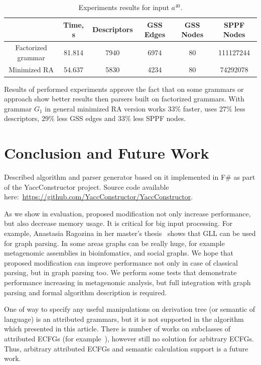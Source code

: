 \documentclass[runningheads,a4paper]{llncs}
\begin{document}
\begin{table}[h]   
\begin{center}
    \begin{tabular}{  c | c | c | c | c | c }
        
                           & Time, s & Descriptors & GSS Edges & GSS Nodes & SPPF Nodes   \\ \hline
        Factorized grammar & 81.814  & 7940        & 6974      & 80        & 111127244  \\ \hline
        Minimized RA       & 54.637  & 5830        & 4234      & 80        & 74292078  \\ 
    \end{tabular}
\end{center}
\caption{Experiments results for input $a^{40}$.}
\label{expTable}
\end{table}



Results of performed experiments approve the fact that on some grammars or approach 
show better results then parsers built on factorized grammars.
With grammar $G_1$ in general minimized RA version works $33\%$ faster, uses $27\%$ less descriptors, $29\%$ less GSS edges
and $33\%$ less SPPF nodes.

\section{Conclusion and Future Work}

Described algorithm and parser generator based on it implemented in F\# as part of the YaccConstructor project.
Source code available here:~\url{https://github.com/YaccConstructor/YaccConstructor}.


As we show in evaluation, proposed modification not only increase performance, but also decrease memory usage. 
It is critical for big input processing.
For example, Anastasia Ragozina in her master's thesis~\cite{ragozina} shows that GLL can be used for graph parsing.  
In some areas graphs can be really huge, for example metagenomic assemblies in bioinfomatics, and social graphs.
We hope that proposed modification can improve performance not only in case of classical parsing, but in graph parsing too. 
We perform some tests that demonstrate performance increasing in metagenomic analysis, but full integration with graph parsing and formal algorithm description is required.

One of way to specify any useful manipulations on derivation tree (or semantic of language) is an attributed grammars, but it is not supported in the algorithm which presented in this article.
There is number of works on subclasses of attributed ECFGs (for example~\cite{AttributedELL}), however still no solution for arbitrary ECFGs.
Thus, arbitrary attributed ECFGs and semantic calculation support is a future work.
\end{document}
